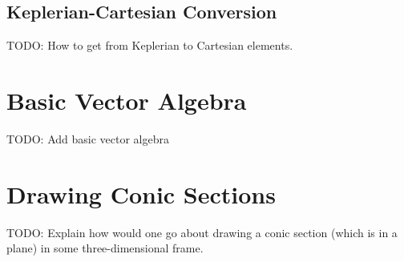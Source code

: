 \documentclass[fleqn]{article}
\begin{document}
\subsection{Keplerian-Cartesian Conversion}
TODO: How to get from Keplerian to Cartesian elements.

\section{Basic Vector Algebra}
TODO: Add basic vector algebra

\section{Drawing Conic Sections}
TODO: Explain how would one go about drawing a conic section (which is in a
plane) in some three-dimensional frame.
\end{document}
